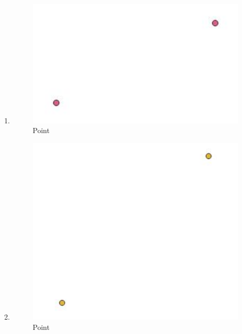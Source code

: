 \begin{enumerate}
	\item 
	
	\begin{figure}[H]
		\includegraphics[width=12cm]{figures/1174042/No3.JPG}
		\centering
		\caption{Point}
	\end{figure}
	
	\item 
	
	\begin{figure}[H]
		\includegraphics[width=12cm]{figures/1174042/No4.JPG}
		\centering
		\caption{Point}
	\end{figure}
	

\end{enumerate}
